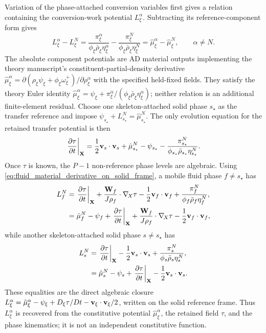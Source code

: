 Variation of the phase-attached conversion variables first gives a relation
containing the conversion-work potential \(L_\xi^\alpha\).  Subtracting its
reference-component form gives
\begin{equation}
	L_\xi^\alpha-L_\xi^N
	=
	\frac{\pi_\xi^\alpha}
	{\phi_\xi\bar\rho_\xi\eta_\xi^\alpha}
	-
	\frac{\pi_\xi^N}
	{\phi_\xi\bar\rho_\xi\eta_\xi^N}
	=
	\hat\mu_\xi^\alpha-\hat\mu_\xi^N,
	\qquad
	\alpha\ne N .
	\label{eq:implementation_transfer_work_component_difference}
\end{equation}
The absolute component potentials are AD material outputs implementing the theory
manuscript's constituent-partial-density derivative
\(\hat\mu_\xi^\alpha
=\partial(\rho_\xi\psi_\xi+\phi_\xi\omega_\xi^+)/
\partial\rho_\xi^\alpha\) with the specified held-fixed fields.  They satisfy
the theory Euler identity
\(\hat\mu_\xi^\alpha
=\psi_\xi+\pi_\xi^\alpha/
(\phi_\xi\bar\rho_\xi\eta_\xi^\alpha)\); neither relation is an additional
finite-element residual.
Choose one skeleton-attached solid phase \(s_\star\) as the transfer reference
and impose
\(\psi_{s_\star}+L_{s_\star}^N=\hat\mu_{s_\star}^N\).
The only evolution equation for the retained transfer potential is then
\begin{align}
	\left.\frac{\partial\tau}{\partial t}\right|_{\mathbf{X}}
	=
	\frac{1}{2}\mathbf{v}_s\cdot\mathbf{v}_s
	+\hat\mu_{s_\star}^N
	-\psi_{s_\star}
	-\frac{\pi_{s_\star}^N}
	{\phi_{s_\star}\bar\rho_{s_\star}\eta_{s_\star}^N}.
	\label{eq:implementation_tau_solid_frame}
\end{align}
Once \(\tau\) is known, the \(P-1\) non-reference phase levels are algebraic.
Using \eqref{eq:fluid_material_derivative_on_solid_frame}, a mobile fluid phase
\(f\ne s_\star\) has
\begin{align}
	L_f^N
	 & =
	\left.\frac{\partial\tau}{\partial t}\right|_{\mathbf{X}}
	+\frac{\mathbf{W}_f}{J\rho_f}\cdot\nabla_{\!X}\tau
	-\frac{1}{2}\mathbf{v}_f\cdot\mathbf{v}_f
	+\frac{\pi_f^N}
	{\phi_f\bar\rho_f\eta_f^N},
	\notag \\
	 & =
	\hat\mu_f^N-\psi_f
	+\left.\frac{\partial\tau}{\partial t}\right|_{\mathbf{X}}
	+\frac{\mathbf{W}_f}{J\rho_f}\cdot\nabla_{\!X}\tau
	-\frac{1}{2}\mathbf{v}_f\cdot\mathbf{v}_f,
	\label{eq:implementation_fluid_transfer_work_recovery}
\end{align}
while another skeleton-attached solid phase \(s\ne s_\star\) has
\begin{align}
	L_s^N
	 & =
	\left.\frac{\partial\tau}{\partial t}\right|_{\mathbf{X}}
	-\frac{1}{2}\mathbf{v}_s\cdot\mathbf{v}_s
	+\frac{\pi_s^N}
	{\phi_s\bar\rho_s\eta_s^N},
	\notag \\
	 & =
	\hat\mu_s^N-\psi_s
	+\left.\frac{\partial\tau}{\partial t}\right|_{\mathbf{X}}
	-\frac{1}{2}\mathbf{v}_s\cdot\mathbf{v}_s.
	\label{eq:implementation_solid_transfer_work_recovery}
\end{align}
These equalities are the direct algebraic closure
\(L_\xi^\alpha=\hat\mu_\xi^\alpha-\psi_\xi
+D_\xi\tau/Dt-\mathbf{v}_\xi\cdot\mathbf{v}_\xi/2\), written on the solid
reference frame.  Thus \(L_\xi^\alpha\) is recovered from the constitutive
potential \(\hat\mu_\xi^\alpha\), the retained field \(\tau\), and the phase
kinematics; it is not an independent constitutive function.

